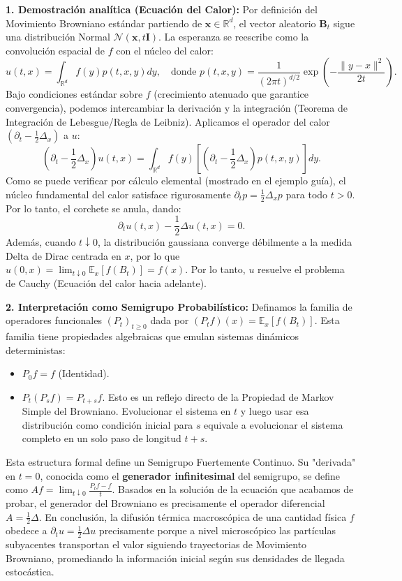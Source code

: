 \documentclass[11pt, letterpaper]{article}
\begin{document}
\begin{solucion}
    \textbf{1. Demostración analítica (Ecuación del Calor):}
    Por definición del Movimiento Browniano estándar partiendo de $\mathbf{x} \in \mathbb{R}^d$, el vector aleatorio $\mathbf{B}_t$ sigue una distribución Normal $\mathcal{N}(\mathbf{x}, t\mathbf{I})$.
    La esperanza se reescribe como la convolución espacial de $f$ con el núcleo del calor:
    \[ u(t,x) = \int_{\mathbb{R}^d} f(y) p(t, x, y) dy, \quad \text{donde } p(t, x, y) = \frac{1}{(2\pi t)^{d/2}} \exp\left( -\frac{\|y-x\|^2}{2t} \right). \]
    Bajo condiciones estándar sobre $f$ (crecimiento atenuado que garantice convergencia), podemos intercambiar la derivación y la integración (Teorema de Integración de Lebesgue/Regla de Leibniz). 
    Aplicamos el operador del calor $\left( \partial_t - \frac{1}{2}\Delta_x \right)$ a $u$:
    \[ \left( \partial_t - \frac{1}{2}\Delta_x \right) u(t,x) = \int_{\mathbb{R}^d} f(y) \left[ \left( \partial_t - \frac{1}{2}\Delta_x \right) p(t, x, y) \right] dy. \]
    Como se puede verificar por cálculo elemental (mostrado en el ejemplo guía), el núcleo fundamental del calor satisface rigurosamente $\partial_t p = \frac{1}{2} \Delta_x p$ para todo $t>0$.
    Por lo tanto, el corchete se anula, dando:
    \[ \partial_t u(t,x) - \frac{1}{2}\Delta u(t,x) = 0. \]
    Además, cuando $t \downarrow 0$, la distribución gaussiana converge débilmente a la medida Delta de Dirac centrada en $x$, por lo que $u(0, x) = \lim_{t \downarrow 0} \mathbb{E}_x[f(B_t)] = f(x)$.
    Por lo tanto, $u$ resuelve el problema de Cauchy (Ecuación del calor hacia adelante).

    \textbf{2. Interpretación como Semigrupo Probabilístico:}
    Definamos la familia de operadores funcionales $(P_t)_{t \ge 0}$ dada por $(P_t f)(x) = \mathbb{E}_x[f(B_t)]$.
    Esta familia tiene propiedades algebraicas que emulan sistemas dinámicos deterministas:
    \begin{itemize}
        \item $P_0 f = f$ (Identidad).
        \item $P_t(P_s f) = P_{t+s} f$. Esto es un reflejo directo de la Propiedad de Markov Simple del Browniano. Evolucionar el sistema en $t$ y luego usar esa distribución como condición inicial para $s$ equivale a evolucionar el sistema completo en un solo paso de longitud $t+s$.
    \end{itemize}
    Esta estructura formal define un Semigrupo Fuertemente Continuo.
    Su "derivada" en $t=0$, conocida como el \textbf{generador infinitesimal} del semigrupo, se define como $A f = \lim_{t \downarrow 0} \frac{P_t f - f}{t}$.
    Basados en la solución de la ecuación que acabamos de probar, el generador del Browniano es precisamente el operador diferencial $A = \frac{1}{2}\Delta$.
    En conclusión, la difusión térmica macroscópica de una cantidad física $f$ obedece a $\partial_t u = \frac{1}{2}\Delta u$ precisamente porque a nivel microscópico las partículas subyacentes transportan el valor siguiendo trayectorias de Movimiento Browniano, promediando la información inicial según sus densidades de llegada estocástica.
\end{solucion}
\end{document}
